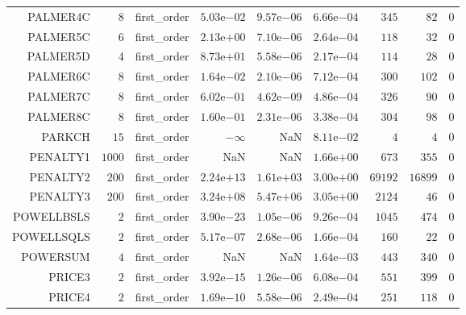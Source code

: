\begin{longtable}{rrrrrrrrr}
PALMER4C & \(     8\) & first\_order & \( 5.03\)e\(-02\) & \( 9.57\)e\(-06\) & \( 6.66\)e\(-04\) & \(   345\) & \(    82\) & \(     0\) \\
PALMER5C & \(     6\) & first\_order & \( 2.13\)e\(+00\) & \( 7.10\)e\(-06\) & \( 2.64\)e\(-04\) & \(   118\) & \(    32\) & \(     0\) \\
PALMER5D & \(     4\) & first\_order & \( 8.73\)e\(+01\) & \( 5.58\)e\(-06\) & \( 2.17\)e\(-04\) & \(   114\) & \(    28\) & \(     0\) \\
PALMER6C & \(     8\) & first\_order & \( 1.64\)e\(-02\) & \( 2.10\)e\(-06\) & \( 7.12\)e\(-04\) & \(   300\) & \(   102\) & \(     0\) \\
PALMER7C & \(     8\) & first\_order & \( 6.02\)e\(-01\) & \( 4.62\)e\(-09\) & \( 4.86\)e\(-04\) & \(   326\) & \(    90\) & \(     0\) \\
PALMER8C & \(     8\) & first\_order & \( 1.60\)e\(-01\) & \( 2.31\)e\(-06\) & \( 3.38\)e\(-04\) & \(   304\) & \(    98\) & \(     0\) \\
PARKCH & \(    15\) & first\_order & \(-\infty\) &       NaN & \( 8.11\)e\(-02\) & \(     4\) & \(     4\) & \(     0\) \\
PENALTY1 & \(  1000\) & first\_order &       NaN &       NaN & \( 1.66\)e\(+00\) & \(   673\) & \(   355\) & \(     0\) \\
PENALTY2 & \(   200\) & first\_order & \( 2.24\)e\(+13\) & \( 1.61\)e\(+03\) & \( 3.00\)e\(+00\) & \( 69192\) & \( 16899\) & \(     0\) \\
PENALTY3 & \(   200\) & first\_order & \( 3.24\)e\(+08\) & \( 5.47\)e\(+06\) & \( 3.05\)e\(+00\) & \(  2124\) & \(    46\) & \(     0\) \\
POWELLBSLS & \(     2\) & first\_order & \( 3.90\)e\(-23\) & \( 1.05\)e\(-06\) & \( 9.26\)e\(-04\) & \(  1045\) & \(   474\) & \(     0\) \\
POWELLSQLS & \(     2\) & first\_order & \( 5.17\)e\(-07\) & \( 2.68\)e\(-06\) & \( 1.66\)e\(-04\) & \(   160\) & \(    22\) & \(     0\) \\
POWERSUM & \(     4\) & first\_order &       NaN &       NaN & \( 1.64\)e\(-03\) & \(   443\) & \(   340\) & \(     0\) \\
PRICE3 & \(     2\) & first\_order & \( 3.92\)e\(-15\) & \( 1.26\)e\(-06\) & \( 6.08\)e\(-04\) & \(   551\) & \(   399\) & \(     0\) \\
PRICE4 & \(     2\) & first\_order & \( 1.69\)e\(-10\) & \( 5.58\)e\(-06\) & \( 2.49\)e\(-04\) & \(   251\) & \(   118\) & \(     0\) \\

\end{longtable}
